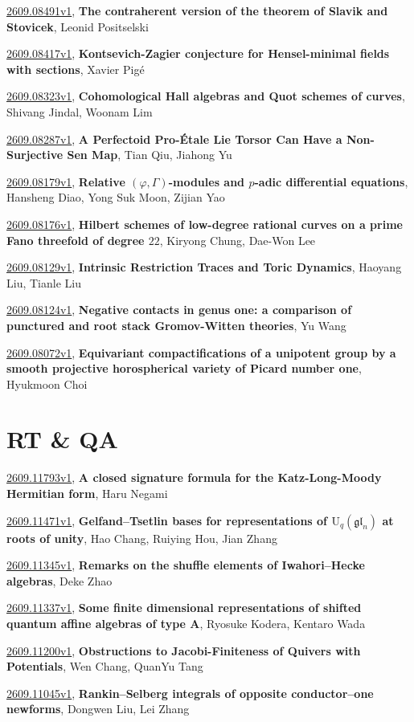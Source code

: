 \documentclass[9pt, a4paper]{article}
\theoremstyle{plain}
\theoremstyle{definition}
\theoremstyle{remark}
\newcommand{\arxiv}[3]{\href{https://arxiv.org/abs/#1}{#1}, \textbf{\textcolor{arxivblue}{#2}}, #3}
\begin{document}
\arxiv{2609.08491v1}{The contraherent version of the theorem of Slavik and Stovicek}{Leonid Positselski}

\arxiv{2609.08417v1}{Kontsevich-Zagier conjecture for Hensel-minimal fields with sections}{Xavier Pigé}

\arxiv{2609.08323v1}{Cohomological Hall algebras and Quot schemes of curves}{Shivang Jindal, Woonam Lim}

\arxiv{2609.08287v1}{A Perfectoid Pro-Étale Lie Torsor Can Have a Non-Surjective Sen Map}{Tian Qiu, Jiahong Yu}

\arxiv{2609.08179v1}{Relative $(\varphi, Γ)$-modules and $p$-adic differential equations}{Hansheng Diao, Yong Suk Moon, Zijian Yao}

\arxiv{2609.08176v1}{Hilbert schemes of low-degree rational curves on a prime Fano threefold of degree $22$}{Kiryong Chung, Dae-Won Lee}

\arxiv{2609.08129v1}{Intrinsic Restriction Traces and Toric Dynamics}{Haoyang Liu, Tianle Liu}

\arxiv{2609.08124v1}{Negative contacts in genus one: a comparison of punctured and root stack Gromov-Witten theories}{Yu Wang}

\arxiv{2609.08072v1}{Equivariant compactifications of a unipotent group by a smooth projective horospherical variety of Picard number one}{Hyukmoon Choi}


\section{RT \& QA}
\arxiv{2609.11793v1}{A closed signature formula for the Katz-Long-Moody Hermitian form}{Haru Negami}

\arxiv{2609.11471v1}{Gelfand--Tsetlin bases for representations of $\mathrm U_{q}(\mathfrak{gl}_n)$ at roots of unity}{Hao Chang, Ruiying Hou, Jian Zhang}

\arxiv{2609.11345v1}{Remarks on the shuffle elements of Iwahori--Hecke algebras}{Deke Zhao}

\arxiv{2609.11337v1}{Some finite dimensional representations of shifted quantum affine algebras of type A}{Ryosuke Kodera, Kentaro Wada}

\arxiv{2609.11200v1}{Obstructions to Jacobi-Finiteness of Quivers with Potentials}{Wen Chang, QuanYu Tang}

\arxiv{2609.11045v1}{Rankin--Selberg integrals of opposite conductor--one newforms}{Dongwen Liu, Lei Zhang}
\end{document}
